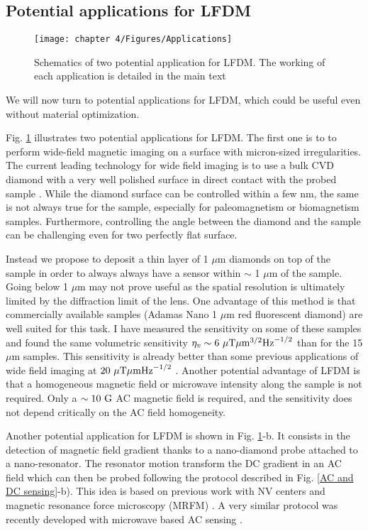 \documentclass[a4paper,11pt]{report}
\begin{document}
\begin{refsection}
\subsection{Potential applications for LFDM}

\begin{figure}[h!]
\centering
\texttt{[image: chapter 4/Figures/Applications]}
\caption{Schematics of two potential application for LFDM. The working of each application is detailed in the main text}
\label{applications}
\end{figure}

We will now turn to potential applications for LFDM, which could be useful even without material optimization.

Fig. \ref{applications} illustrates two potential applications for LFDM. The first one is to to perform wide-field magnetic imaging on a surface with micron-sized irregularities. The current leading technology for wide field imaging is to use a bulk CVD diamond with a very well polished surface in direct contact with the probed sample \citep{levine2019principles, scholten2021widefield}. While the diamond surface can be controlled within a few nm, the same is not always true for the sample, especially for paleomagnetism or biomagnetism samples. Furthermore, controlling the angle between the diamond and the sample can be challenging even for two perfectly flat surface. 

Instead we propose to deposit a thin layer of 1 $\mu$m diamonds on top of the sample in order to always always have a sensor within $\sim$ 1 $\mu$m of the sample. Going below 1 $\mu$m may not prove useful as the spatial resolution is ultimately limited by the diffraction limit of the lens. One advantage of this method is that commercially available samples (Adamas Nano 1 $\mu$m red fluorescent diamond) are well suited for this task. I have measured the sensitivity on some of these samples and found the same volumetric sensitivity $\eta_v \sim 6 \ \rm{\mu T}\mu \rm{m}^{3/2} \rm{Hz}^{-1/2}$ than for the 15 $\mu$m samples. This sensitivity is already better than some previous applications of wide field imaging at $20  \ \rm{\mu T}\mu \rm{m} \rm{Hz}^{-1/2}$ \citep{glenn2017micrometer}. Another potential advantage of LFDM is that a homogeneous magnetic field or microwave intensity along the sample is not required. Only a $\sim 10 \ \rm G$ AC magnetic field is required, and the sensitivity does not depend critically on the AC field homogeneity.

Another potential application for LFDM is shown in Fig. \ref{applications}-b. It consists in the detection of magnetic field gradient thanks to a nano-diamond probe attached to a nano-resonator. The resonator motion transform the DC gradient in an AC field which can then be probed following the protocol described in Fig. \ref{AC and DC sensing}-b). This idea is based on previous work with NV centers \citep{arcizet2011single} and magnetic resonance force microscopy (MRFM) \citep{rugar2004single}. A very similar protocol was recently developed with microwave based AC sensing \citep{huxter2022scanning}. 


\end{refsection}
\end{document}
